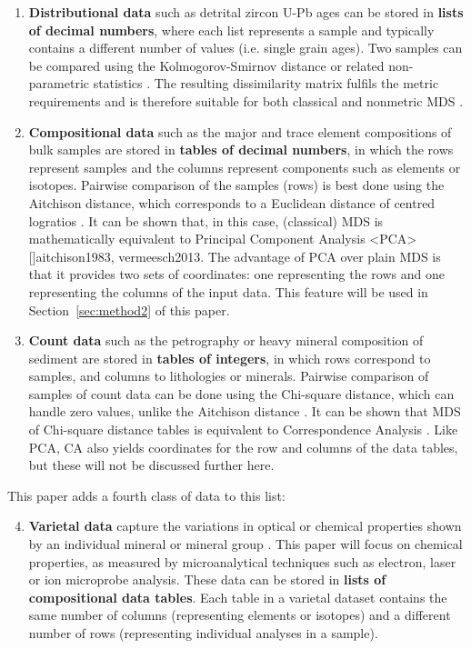 \documentclass{article}
\begin{document}
\begin{enumerate}
\item{\bf Distributional data} such as detrital zircon U-Pb ages can
  be stored in \textbf{lists of decimal numbers}, where each list
  represents a sample and typically contains a different number of
  values (i.e. single grain ages). Two samples can be compared using
  the Kolmogorov-Smirnov distance or related non-parametric statistics
  \cite{vermeesch2018b}. The resulting dissimilarity matrix fulfils
  the metric requirements and is therefore suitable for both classical
  and nonmetric MDS \cite{vermeesch2013}.
\item{\bf Compositional data} such as the major and trace element
  compositions of bulk samples are stored in \textbf{tables of decimal
    numbers}, in which the rows represent samples and the columns
  represent components such as elements or isotopes. Pairwise
  comparison of the samples (rows) is best done using the Aitchison
  distance, which corresponds to a Euclidean distance of centred
  logratios \cite{aitchison1986}. It can be shown that, in this case,
  (classical) MDS is mathematically equivalent to Principal Component
  Analysis \citeA<PCA>[]{aitchison1983, vermeesch2013}. The advantage
  of PCA over plain MDS is that it provides two sets of coordinates:
  one representing the rows and one representing the columns of the
  input data. This feature will be used in Section~\ref{sec:method2}
  of this paper.
\item{\bf Count data} such as the petrography or heavy mineral
  composition of sediment are stored in \textbf{tables of integers},
  in which rows correspond to samples, and columns to lithologies or
  minerals.  Pairwise comparison of samples of count data can be done
  using the Chi-square distance, which can handle zero values, unlike
  the Aitchison distance \cite{vermeesch2018d}. It can be shown that
  MDS of Chi-square distance tables is equivalent to Correspondence
  Analysis \cite[CA,]{greenacre1984}. Like PCA, CA also yields
  coordinates for the row and columns of the data tables, but these
  will not be discussed further here.
\end{enumerate}

This paper adds a fourth class of data to this list:

\begin{enumerate}
  \setcounter{enumi}{3}
\item{\bf Varietal data} capture the variations in optical or chemical
  properties shown by an individual mineral or mineral group
  \cite{morton1985b,morton1991}. This paper will focus on chemical
  properties, as measured by microanalytical techniques such as
  electron, laser or ion microprobe analysis. These data can be stored
  in \textbf{lists of compositional data tables}. Each table in a
  varietal dataset contains the same number of columns (representing
  elements or isotopes) and a different number of rows (representing
  individual analyses in a sample).
\end{enumerate}
\end{document}
